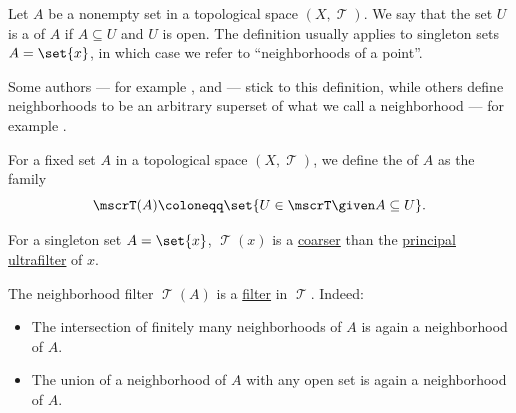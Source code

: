 \begin{definition}\label{def:topological_neighborhood}
  Let \( A \) be a nonempty set in a topological space \( (X, \mscrT) \). We say that the set \( U \) is a  of \( A \) if \( A \subseteq U \) and \( U \) is open. The definition usually applies to singleton sets \( A = \set{ x } \), in which case we refer to \enquote{neighborhoods of a point}.
\end{definition}
\begin{comments}
  \item Some authors --- for example \textcite[12]{Engelking1989GeneralTopology}, \textcite[7]{Rudin1991FunctionalAnalysis} and \textcite[def. 4.1]{Александров1977ОбщаяТопология} --- stick to this definition, while others define neighborhoods to be an arbitrary superset of what we call a neighborhood --- for example \textcite[8]{Kelley1975GeneralTopology}.
\end{comments}

\begin{definition}\label{def:neighborhood_filter}
  For a fixed set \( A \) in a topological space \( (X, \mscrT) \), we define the  of \( A \) as the family
  \begin{equation*}
    \mscrT(A) \coloneqq \set{ U \in \mscrT \given A \subseteq U }.
  \end{equation*}
\end{definition}
\begin{comments}
  \item For a singleton set \( A = \set{ x } \), \( \mscrT(x) \) is a \hyperref[def:filter_ordering]{coarser} than the \hyperref[def:principal_ultrafilter]{principal ultrafilter} of \( x \).
\end{comments}
\begin{defproof}
  The neighborhood filter \( \mscrT(A) \) is a \hyperref[def:lattice_ideal]{filter} in \( \mscrT \). Indeed:
  \begin{itemize}
    \item The intersection of finitely many neighborhoods of \( A \) is again a neighborhood of \( A \).
    \item The union of a neighborhood of \( A \) with any open set is again a neighborhood of \( A \).
  \end{itemize}
\end{defproof}

